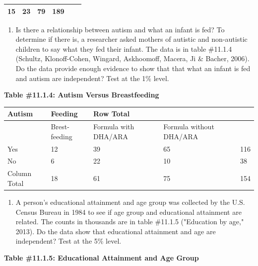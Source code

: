 \documentclass[
]{book}
\providecommand{\tightlist}{%
  \setlength{\itemsep}{0pt}\setlength{\parskip}{0pt}}
\begin{document}
\begin{longtable}[]{@{}llllll@{}}
\begin{minipage}[t]{0.09\columnwidth}
15\strut
\end{minipage} & \begin{minipage}[t]{0.14\columnwidth}\raggedright
23\strut
\end{minipage} & \begin{minipage}[t]{0.12\columnwidth}\raggedright
79\strut
\end{minipage} & \begin{minipage}[t]{0.07\columnwidth}\raggedright
189\strut
\end{minipage}\tabularnewline
\bottomrule
\end{longtable}

\begin{enumerate}
\def\labelenumi{\arabic{enumi}.}
\setcounter{enumi}{2}
\tightlist
\item
  Is there a relationship between autism and what an infant is fed? To determine if there is, a researcher asked mothers of autistic and non-autistic children to say what they fed their infant. The data is in table \#11.1.4 (Schultz, Klonoff-Cohen, Wingard, Askhoomoff, Macera, Ji \& Bacher, 2006). Do the data provide enough evidence to show that that what an infant is fed and autism are independent? Test at the 1\% level.
\end{enumerate}

\textbf{Table \#11.1.4: Autism Versus Breastfeeding}

\begin{longtable}[]{@{}lllll@{}}
\toprule
Autism & Feeding & Row Total & &\tabularnewline
\midrule
\endhead
& Brest-feeding & Formula with DHA/ARA & Formula without DHA/ARA &\tabularnewline
Yes & 12 & 39 & 65 & 116\tabularnewline
No & 6 & 22 & 10 & 38\tabularnewline
Column Total & 18 & 61 & 75 & 154\tabularnewline
\bottomrule
\end{longtable}

\begin{enumerate}
\def\labelenumi{\arabic{enumi}.}
\setcounter{enumi}{3}
\tightlist
\item
  A person's educational attainment and age group was collected by the U.S. Census Bureau in 1984 to see if age group and educational attainment are related. The counts in thousands are in table \#11.1.5 ("Education by age," 2013). Do the data show that educational attainment and age are independent? Test at the 5\% level.
\end{enumerate}

\textbf{Table \#11.1.5: Educational Attainment and Age Group}
\end{document}
